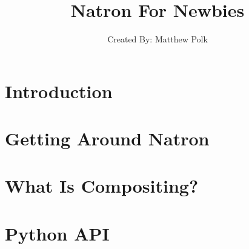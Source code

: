 \documentclass[12pt, oneside, openany, showtrims, letterpaper]{memoir}
\title{Natron For Newbies}
\author{Created By: Matthew Polk}
\date{}
\begin{document}
\maketitle

\newpage
\tableofcontents*
\pagestyle{empty}


\cleardoublepage

%
\setcounter{page}{1}
\chapter{Introduction}

\chapter{Getting Around Natron}

\chapter{What Is Compositing?}

\chapter{Python API}
\end{document}
